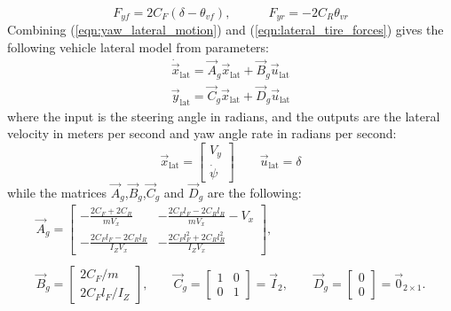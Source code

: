 \begin{equation}
	\label{eqn:lateral_tire_forces}
	F_{yf} = 2C_F(\delta-\theta_{vf}),\qquad\quad
	F_{yr} = -2C_R\theta_{vr}
\end{equation}
Combining (\ref{eqn:yaw_lateral_motion}) and (\ref{eqn:lateral_tire_forces}) gives the following vehicle lateral model from parameters: 
\begin{equation}
\label{eqn:lateral_dynamics_simple_model}
\begin{array}{ll}
\dot{\vec{x}}_{\text{lat}} =\vec{A}_g \vec{x}_{\text{lat}}+ \vec{B}_g \vec{u}_{\text{lat}}\\
\vec{y}_{\text{lat}} =\vec{C}_g \vec{x}_{\text{lat}} + \vec{D}_g \vec{u}_{\text{lat}}
\end{array}
\end{equation}
where the input is the steering angle in radians, and the outputs are the lateral velocity in meters per second and yaw angle rate in radians per second:
\begin{equation}
\vec{x}_{\text{lat}} = \begin{bmatrix}
V_y\\\dot{\psi}
\end{bmatrix}
\qquad
\vec{u}_{\text{lat}} = \delta
\end{equation}
while the matrices $\vec{A}_g$,$\vec{B}_g$,$\vec{C}_g$ and $\vec{D}_g$ are the following:
\begin{equation}
\begin{array}{cc}
\vec{A}_g=
\begin{bmatrix}
\displaystyle -\frac{2C_F+2C_R}{mV_x}&\displaystyle -\frac{2C_Fl_F-2C_Rl_R}{mV_x} - V_x\\
\displaystyle -\frac{2C_Fl_F-2C_Rl_R}{I_ZV_x}&\displaystyle -\frac{2C_Fl_F^2+2C_Rl_R^2}{I_ZV_x}
\end{bmatrix},
\\\\
\vec{B}_g=\begin{bmatrix}
2C_F/m\\2C_Fl_F/I_Z
\end{bmatrix},
\qquad
\vec{C}_g=\begin{bmatrix}
1&0\\0&1
\end{bmatrix}=
\vec{I}_2, 
\qquad
\vec{D}_g=\begin{bmatrix}
0\\0
\end{bmatrix}=
\vec{0}_{2\times1}.
\end{array}
\end{equation}
